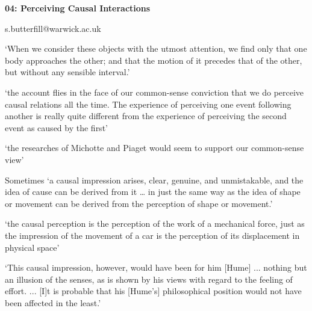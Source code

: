 \documentclass[12pt]{extarticle}
\date{}
\makeatletter
\def \ititle {Philosophical Psychology}
\def \iemail{s.butterfill@warwick.ac.uk}
\makeatother
\begin{document}
\begin{multicols*}{3}

\setlength\footnotesep{1em}











\def \ititle {04: Perceiving Causal Interactions}

\begin{center}

{\Large

\textbf{\ititle}

}



\iemail %

\end{center}

‘When we consider these objects with the utmost attention, we find only
that one body approaches the other; and that the motion of it precedes
that of the other, but without any sensible interval.’ \citep[p.~77]{Hume:1739lj}

‘the account flies in the face of our common-sense conviction that we do
perceive causal relations all the time. The experience of perceiving one
event following another is really quite different from the experience of
perceiving the second event as caused by the first’

‘the researches of Michotte and Piaget would seem to support our
common-sense view’
\citep[pp.~114-5]{Searle:1983tx}

Sometimes ‘a causal impression arises, clear,
genuine, and unmistakable, and the idea of cause can be derived from it
… in just the same way as the idea of shape or movement can be derived
from the perception of shape or movement.’
\citep[p.~270--1]{Michotte:1946nz}

‘the causal perception is the perception of the work of a mechanical force,
just as the impression of the movement of a car is the perception of its
displacement in physical space’
\citep[p.~228]{Michotte:1946nz}

‘This causal impression, however, would have been for him [Hume] ...
nothing but an illusion of the senses, as is shown by his
views with regard to the feeling of effort. ... [I]t is probable that his
[Hume’s] philosophical position would not have been affected in the
least.’
\citep[p.~256]{Michotte:1946nz}


\end{multicols*}
\end{document}
